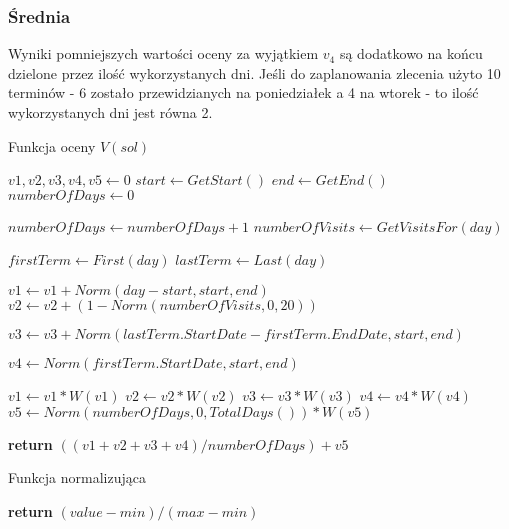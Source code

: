 \subsubsection{Średnia} 
Wyniki pomniejszych wartości oceny za wyjątkiem $v_4$ są dodatkowo na końcu dzielone przez ilość
wykorzystanych dni. Jeśli do zaplanowania zlecenia użyto 10 terminów - 6 zostało
przewidzianych na poniedziałek a 4 na wtorek - to ilość wykorzystanych dni jest
równa 2.

\begin{algorithm}
	\caption{Funkcja oceny $V(sol)$}\label{fn-obj}
\begin{algorithmic}[1]
\State $v1,v2,v3,v4,v5 \gets 0$
\State $start \gets GetStart()$
\State $end \gets GetEnd()$
\State $numberOfDays \gets 0$

\State $numberOfDays \gets numberOfDays+1$
\State $numberOfVisits \gets GetVisitsFor(day)$

\State $firstTerm \gets First(day)$
\State $lastTerm \gets Last(day)$

\State $v1 \gets v1 + Norm(day-start,start,end)$
\State $v2 \gets v2 + (1 - Norm(numberOfVisits,0,20))$

\State $v3 \gets v3 + Norm(lastTerm.StartDate-firstTerm.EndDate,start,end)$
\EndIf

\State $v4 \gets Norm(firstTerm.StartDate,start,end)$

\EndFor
\State $v1 \gets v1*W(v1)$
\State $v2 \gets v2*W(v2)$
\State $v3 \gets v3*W(v3)$
\State $v4 \gets v4*W(v4)$
\State $v5 \gets Norm(numberOfDays,0,TotalDays())*W(v5)$

\State \textbf{return} $((v1+v2+v3+v4)/numberOfDays)+v5$
\EndProcedure
\end{algorithmic}
\end{algorithm}

\begin{algorithm}
	\caption{Funkcja normalizująca}\label{fn-normalize}
\begin{algorithmic}[1]
\State \textbf{return} $(value-min)/(max-min)$
\EndFunction
\end{algorithmic}
\end{algorithm}
\newpage
